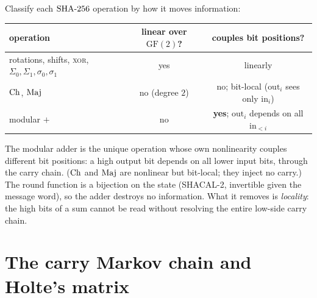 \documentclass[11pt]{article}
\begin{document}
Classify each $\mathrm{SHA\text{-}256}$ operation by how it moves information:

\begin{center}
\begin{tabular}{lcc}
\hline
operation & linear over $\mathrm{GF}(2)$? & couples bit positions?\\
\hline
rotations, shifts, \textsc{xor}, $\Sigma_0,\Sigma_1,\sigma_0,\sigma_1$ & yes & linearly\\
$\mathrm{Ch}$, $\mathrm{Maj}$ & no (degree $2$) & no; bit-local ($\text{out}_i$ sees only $\text{in}_i$)\\
modular $+$ & no & \textbf{yes}; $\text{out}_i$ depends on all $\text{in}_{<i}$\\
\hline
\end{tabular}
\end{center}

The modular adder is the unique operation whose own nonlinearity couples
different bit positions: a high output bit depends on all lower input bits,
through the carry chain. ($\mathrm{Ch}$ and $\mathrm{Maj}$ are nonlinear but bit-local;
they inject no carry.) The round function is a bijection on the state
(SHACAL-2, invertible given the message word), so the adder destroys no
information. What it removes is \emph{locality}: the high bits of a sum
cannot be read without resolving the entire low-side carry chain.

\section{The carry Markov chain and Holte's matrix}\label{sec:markov}
\end{document}
